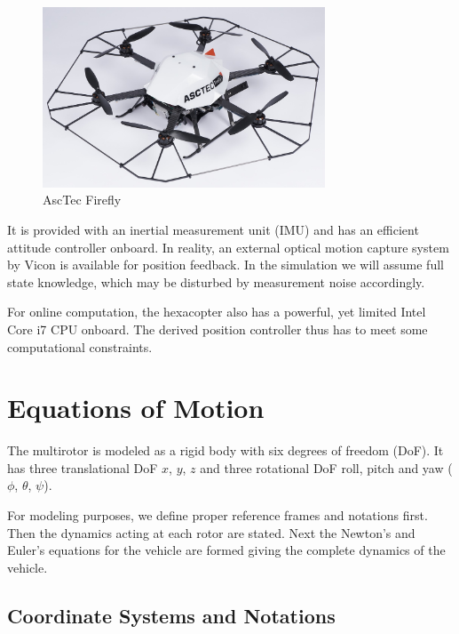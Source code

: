 \begin{figure}
   \centering
   \includegraphics[width=0.75\textwidth]{images/firefly.jpg}
   \caption{AscTec Firefly \cite{www:asctec}}
   \label{pics:firefly}
\end{figure}

It is provided with an inertial measurement unit (IMU) and has an efficient attitude controller onboard. In reality, an external optical motion capture system by Vicon is available for position feedback. In the simulation we will assume full state knowledge, which may be disturbed by measurement noise accordingly.

For online computation, the hexacopter also has a powerful, yet limited Intel Core i7 CPU onboard. The derived position controller thus has to meet some computational constraints.

\section{Equations of Motion}
\label{sec:eq_of_motion}
The multirotor is modeled as a rigid body with six degrees of freedom (DoF). It has three translational DoF $x$, $y$, $z$ and three rotational DoF roll, pitch and yaw ($\phi$, $\theta$, $\psi$).

 For modeling purposes, we define proper reference frames and notations first. Then the dynamics acting at each rotor are stated. Next the Newton's and Euler's equations for the vehicle are formed giving the complete dynamics of the vehicle.

\subsection{Coordinate Systems and Notations}
\label{sec:coordinates}
